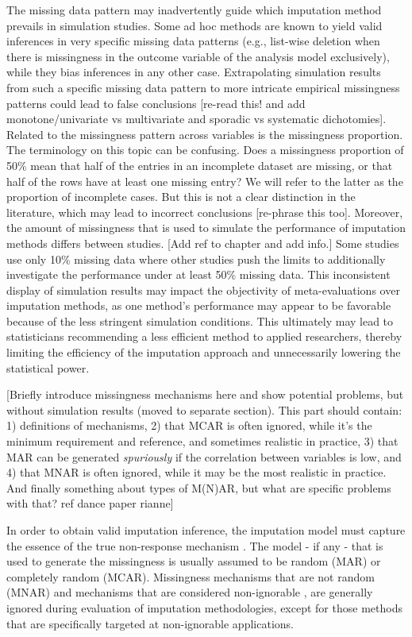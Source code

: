 \documentclass[bimj,fleqn]{w-art}
\theoremstyle{plain}
\theoremstyle{definition}
\begin{document}
The missing data pattern may inadvertently guide which imputation method prevails in simulation studies. Some ad hoc methods are known to yield valid inferences in very specific missing data patterns (e.g., list-wise deletion when there is missingness in the outcome variable of the analysis model exclusively), while they bias inferences in any other case. Extrapolating simulation results from such a specific missing data pattern to more intricate empirical missingness patterns could lead to false conclusions [re-read this! and add monotone/univariate vs multivariate and sporadic vs systematic dichotomies]. Related to the missingness pattern across variables is the missingness proportion. The terminology on this topic can be confusing. Does a missingness proportion of 50\% mean that half of the entries in an incomplete dataset are missing, or that half of the rows have at least one missing entry? We will refer to the latter as the proportion of incomplete cases. But this is not a clear distinction in the literature, which may lead to incorrect conclusions [re-phrase this too]. Moreover, the amount of missingness that is used to simulate the performance of imputation methods differs between studies. [Add ref to chapter \citep{liu21} and add info.] Some studies use only 10\% missing data where other studies push the limits to additionally investigate the performance under at least 50\% missing data. This inconsistent display of simulation results may impact the objectivity of meta-evaluations over imputation methods, as one method's performance may appear to be favorable because of the less stringent simulation conditions. This ultimately may lead to statisticians recommending a less efficient method to applied researchers, thereby limiting the efficiency of the imputation approach and unnecessarily lowering the statistical power.

[Briefly introduce missingness mechanisms here and show potential problems, but without simulation results (moved to separate section). This part should contain: 1) definitions of mechanisms, 2) that MCAR is often ignored, while it's the minimum requirement and reference, and sometimes realistic in practice, 3) that MAR can be generated \emph{spuriously} if the correlation between variables is low, and 4) that MNAR is often ignored, while it may be the most realistic in practice. And finally something about types of M(N)AR, but what are specific problems with that? ref dance paper rianne]

In order to obtain valid imputation inference, the imputation model must capture the essence of the true non-response mechanism \citep{meng94}. The model - if any - that is used to generate the missingness is usually assumed to be random (MAR) or completely random (MCAR). Missingness mechanisms that are not random (MNAR) and mechanisms that are considered non-ignorable \citep[see e.g.][]{rubi76}, are generally ignored during evaluation of imputation methodologies, except for those methods that are specifically targeted at non-ignorable applications.
\end{document}
